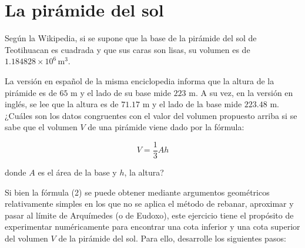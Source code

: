 \documentclass[12pt]{article}
\begin{document}
\section{\large La pirámide del sol}

Según la Wikipedia, si se supone que la base de la pirámide del sol de Teotihuacan es cuadrada y que sus caras son lisas, su volumen es de $1.184828 \times 10^6 \, \text{m}^3$.

La versión en español de la misma enciclopedia informa que la altura de la pirámide es de $65$ m y el lado de su base mide $223$ m. A su vez, en la versión en inglés, se lee que la altura es de $71.17$ m y el lado de la base mide $223.48$ m. ¿Cuáles son los datos congruentes con el valor del volumen propuesto arriba si se sabe que el volumen $V$ de una pirámide viene dado por la fórmula:

\[
V = \frac{1}{3} A h \tag{2}
\]

donde $A$ es el área de la base y $h$, la altura?

Si bien la fórmula (2) se puede obtener mediante argumentos geométricos relativamente simples en los que no se aplica el método de rebanar, aproximar y pasar al límite de Arquímedes (o de Eudoxo), este ejercicio tiene el propósito de experimentar numéricamente para encontrar una cota inferior y una cota superior del volumen $V$ de la pirámide del sol. Para ello, desarrolle los siguientes pasos:
\end{document}
